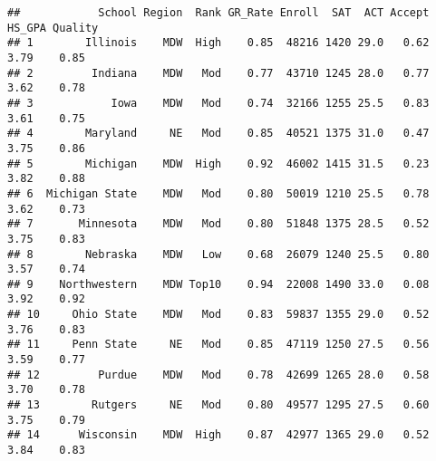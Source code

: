\documentclass[
]{article}
\newenvironment{Shaded}{\begin{snugshade}}{\end{snugshade}}
\newcommand{\CommentTok}[1]{\textcolor[rgb]{0.56,0.35,0.01}{\textit{#1}}}
\newcommand{\DecValTok}[1]{\textcolor[rgb]{0.00,0.00,0.81}{#1}}
\newcommand{\DocumentationTok}[1]{\textcolor[rgb]{0.56,0.35,0.01}{\textbf{\textit{#1}}}}
\newcommand{\FunctionTok}[1]{\textcolor[rgb]{0.00,0.00,0.00}{#1}}
\newcommand{\NormalTok}[1]{#1}
\newcommand{\OtherTok}[1]{\textcolor[rgb]{0.56,0.35,0.01}{#1}}
\newcommand{\SpecialCharTok}[1]{\textcolor[rgb]{0.00,0.00,0.00}{#1}}
\begin{document}
\begin{Shaded}
\end{Shaded}

\begin{verbatim}
##            School Region  Rank GR_Rate Enroll  SAT  ACT Accept HS_GPA Quality
## 1        Illinois    MDW  High    0.85  48216 1420 29.0   0.62   3.79    0.85
## 2         Indiana    MDW   Mod    0.77  43710 1245 28.0   0.77   3.62    0.78
## 3            Iowa    MDW   Mod    0.74  32166 1255 25.5   0.83   3.61    0.75
## 4        Maryland     NE   Mod    0.85  40521 1375 31.0   0.47   3.75    0.86
## 5        Michigan    MDW  High    0.92  46002 1415 31.5   0.23   3.82    0.88
## 6  Michigan State    MDW   Mod    0.80  50019 1210 25.5   0.78   3.62    0.73
## 7       Minnesota    MDW   Mod    0.80  51848 1375 28.5   0.52   3.75    0.83
## 8        Nebraska    MDW   Low    0.68  26079 1240 25.5   0.80   3.57    0.74
## 9    Northwestern    MDW Top10    0.94  22008 1490 33.0   0.08   3.92    0.92
## 10     Ohio State    MDW   Mod    0.83  59837 1355 29.0   0.52   3.76    0.83
## 11     Penn State     NE   Mod    0.85  47119 1250 27.5   0.56   3.59    0.77
## 12         Purdue    MDW   Mod    0.78  42699 1265 28.0   0.58   3.70    0.78
## 13        Rutgers     NE   Mod    0.80  49577 1295 27.5   0.60   3.75    0.79
## 14      Wisconsin    MDW  High    0.87  42977 1365 29.0   0.52   3.84    0.83
\end{verbatim}
\end{document}
